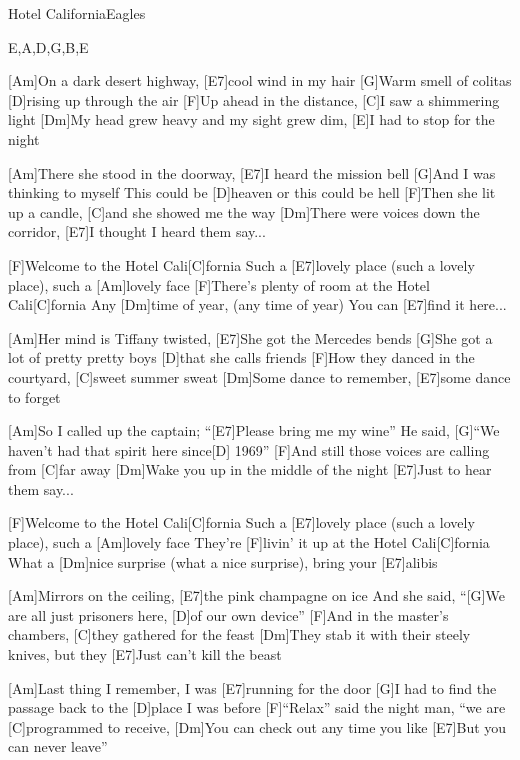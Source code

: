 \documentclass[../main.tex]{subfiles}
\begin{document}
\begin{song}[2]{Hotel California}{Eagles}{}
\begin{tabline}{4}{6}{8}{E,A,D,G,B,E}
		\nextbar
\end{tabline}


[Am]On a dark desert highway, [E7]cool wind in my hair
[G]Warm smell of colitas [D]rising up through the air
[F]Up ahead in the distance, [C]I saw a shimmering light
[Dm]My head grew heavy and my sight grew dim,
[E]I had to stop for the night

[Am]There she stood in the doorway, [E7]I heard the mission bell
[G]And I was thinking to myself
This could be [D]heaven or this could be hell
[F]Then she lit up a candle, [C]and she showed me the way
[Dm]There were voices down the corridor,
[E7]I thought I heard them say...

[F]Welcome to the Hotel Cali[C]fornia
Such a [E7]lovely place (such a lovely place), such a [Am]lovely face
[F]There's plenty of room at the Hotel Cali[C]fornia
Any [Dm]time of year, (any time of year) You can [E7]find it here...

[Am]Her mind is Tiffany twisted, [E7]She got the Mercedes bends
[G]She got a lot of pretty pretty boys [D]that she calls friends
[F]How they danced in the courtyard, [C]sweet summer sweat
[Dm]Some dance to remember, [E7]some dance to forget

[Am]So I called up the captain; ``[E7]Please bring me my wine'' 
He said, [G]``We haven't had that spirit here since[D] 1969''
[F]And still those voices are calling from [C]far away
[Dm]Wake you up in the middle of the night
[E7]Just to hear them say...\pagebreak

[F]Welcome to the Hotel Cali[C]fornia
Such a [E7]lovely place (such a lovely place), such a [Am]lovely face
They're [F]livin' it up at the Hotel Cali[C]fornia
What a [Dm]nice surprise (what a nice surprise), bring your [E7]alibis

[Am]Mirrors on the ceiling, [E7]the pink champagne on ice 
And she said, ``[G]We are all just prisoners here, [D]of our own device''
[F]And in the master's chambers, [C]they gathered for the feast
[Dm]They stab it with their steely knives, but they
[E7]Just can't kill the beast

[Am]Last thing I remember, I was [E7]running for the door
[G]I had to find the passage back to the [D]place I was before
[F]``Relax'' said the night man, ``we are [C]programmed to receive,
[Dm]You can check out any time you like
[E7]But you can never leave''

\end{song}
\end{document}

